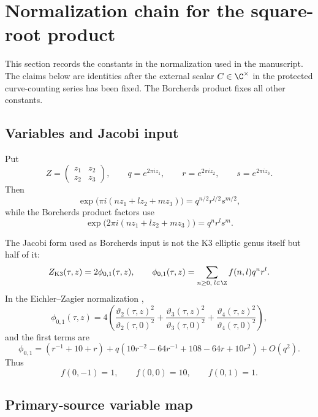 \section{Normalization chain for the square-root product}

This section records the constants in the normalization used in the
manuscript.  The claims below are identities after the external scalar
$C\in\C^\times$ in the protected curve-counting series has been fixed.
The Borcherds product fixes all other constants.

\subsection{Variables and Jacobi input}

Put
$$
Z=\begin{pmatrix}z_1&z_2\\ z_2&z_3\end{pmatrix},\qquad
q=e^{2\pi i z_1},\qquad r=e^{2\pi i z_2},\qquad
s=e^{2\pi i z_3}.
$$
Then
$$
\exp\bigl(\pi i(nz_1+lz_2+mz_3)\bigr)
=q^{n/2}r^{l/2}s^{m/2},
$$
while the Borcherds product factors use
$$
\exp\bigl(2\pi i(nz_1+lz_2+mz_3)\bigr)
=q^nr^ls^m.
$$

The Jacobi form used as Borcherds input is not the K3 elliptic genus
itself but half of it:
$$
Z_{\mathrm{K3}}(\tau,z)=2\phi_{0,1}(\tau,z),
\qquad
\phi_{0,1}(\tau,z)=\sum_{n\geq0,\;l\in\Z}f(n,l)q^nr^l.
$$
In the Eichler--Zagier normalization \cite{EZ:1},
$$
\phi_{0,1}(\tau,z)
=4\left(
\frac{\vartheta_2(\tau,z)^2}{\vartheta_2(\tau,0)^2}
+\frac{\vartheta_3(\tau,z)^2}{\vartheta_3(\tau,0)^2}
+\frac{\vartheta_4(\tau,z)^2}{\vartheta_4(\tau,0)^2}
\right),
$$
and the first terms are
$$
\phi_{0,1}
=(r^{-1}+10+r)
+q(10r^{-2}-64r^{-1}+108-64r+10r^2)+O(q^2).
$$
Thus
$$
f(0,-1)=1,\qquad f(0,0)=10,\qquad f(0,1)=1.
$$

\subsection{Primary-source variable map}

